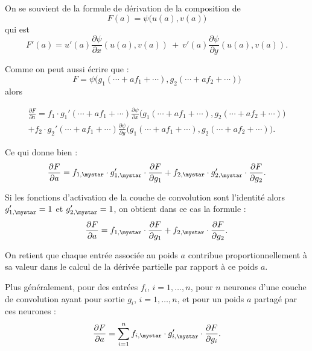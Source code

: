\documentclass[11pt,class=report,crop=false]{standalone}
\begin{document}
On se souvient de la formule de dérivation de la composition de
$$F(a) = \psi\big( u(a), v(a) \big)$$
qui est 
$$F'(a) = u'(a) \frac{\partial \psi}{\partial x}(u(a),v(a)) \  + \  v'(a) \frac{\partial \psi}{\partial y}(u(a),v(a)).$$

Comme on peut aussi écrire que :
$$F = \psi\big( g_1(\cdots + af_1+\cdots) , g_2(\cdots + af_2+\cdots) \big)$$
alors

\begin{align*}
\frac{\partial F}{\partial a} =
f_1 \cdot g_1'(\cdots + af_1+\cdots) \frac{\partial \psi}{\partial x}\big( g_1(\cdots + af_1+\cdots) , g_2(\cdots + af_2+\cdots)\big) \\
+ 
f_2 \cdot g_2'(\cdots + af_1+\cdots) \frac{\partial \psi}{\partial y}\big( g_1(\cdots + af_1+\cdots) , g_2(\cdots + af_2+\cdots)\big).
\end{align*}

Ce qui donne bien :
$$\frac{\partial F}{\partial a} =
f_{1,\mystar} \cdot g'_{1,\mystar} \cdot \frac{\partial F}{\partial g_1}
+ 
f_{2,\mystar} \cdot g'_{2,\mystar} \cdot \frac{\partial F}{\partial g_2}.
$$


Si les fonctions d'activation de la couche de convolution sont l'identité alors $g'_{1,\mystar} = 1$ et $g'_{2,\mystar} = 1$, on obtient dans ce cas la formule :
$$\frac{\partial F}{\partial a} =
f_{1,\mystar} \cdot \frac{\partial F}{\partial g_1}
+ 
f_{2,\mystar} \cdot \frac{\partial F}{\partial g_2}.$$

On retient que chaque entrée associée au poids $a$ contribue proportionnellement à sa valeur dans le calcul de la dérivée partielle par rapport à ce poids $a$.

Plus généralement, pour des entrées $f_i$, $i=1,\ldots,n$, pour $n$ neurones d'une couche de convolution ayant pour sortie $g_i$, $i=1,\ldots,n$, et pour un poids $a$ partagé par ces neurones :
$$\frac{\partial F}{\partial a} = \sum_{i=1}^n f_{i,\mystar} \cdot g'_{i,\mystar} \cdot \frac{\partial F}{\partial g_i}.$$
\end{document}
